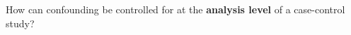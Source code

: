 How can confounding be controlled for at the {\bf analysis level} of a case-control study?
\begin{MultipleChoice}[itemname=II-19]
\end{MultipleChoice}
